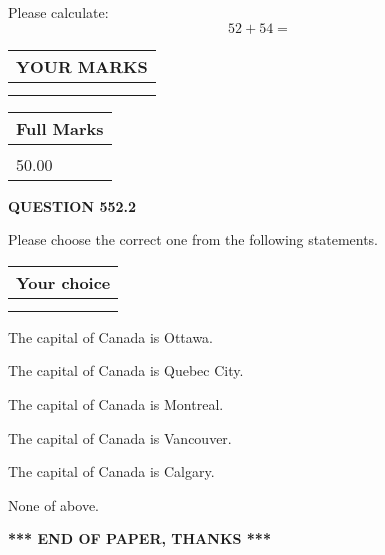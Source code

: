 \documentclass[12pt]{article}
\begin{document}
  
 
Please calculate:
\begin{equation}
52 +  %
54 = \nonumber
\end{equation}
 

 

 
  
\vspace{0.2in}
  
\noindent\begin{tabular}{|l|}
\hline
 YOUR MARKS  \\
\hline
 \\ 
 \\ 
\hline
\end{tabular}
\hspace{0.05in} \begin{tabular}{|l|}
\hline
 Full Marks  \\
\hline
 \\ 
50.00 \\
\hline
\end{tabular}
{\textbf{\Large{QUESTION
552.2 
}}}
  
  
Please choose the correct one from the following statements.
  
  
\noindent\hspace{3.0in} \begin{tabular}{|l|}
\hline
Your choice \\
\hline
 \\ 
 \\ 
\hline
\end{tabular}
  
  
 
 
The capital of Canada is Ottawa.
 
 
The capital of Canada is Quebec City.
 
 
The capital of Canada is Montreal.
 
 
The capital of Canada is Vancouver.
 
 
The capital of Canada is Calgary.
 
 
 None of above.
 
 
   
   
 \vspace{0.2in}
 
   
   
   
   
\vspace{1.0in} 
{\textbf{\large{ *** END OF PAPER, THANKS *** }}} 
   
\end{document}
